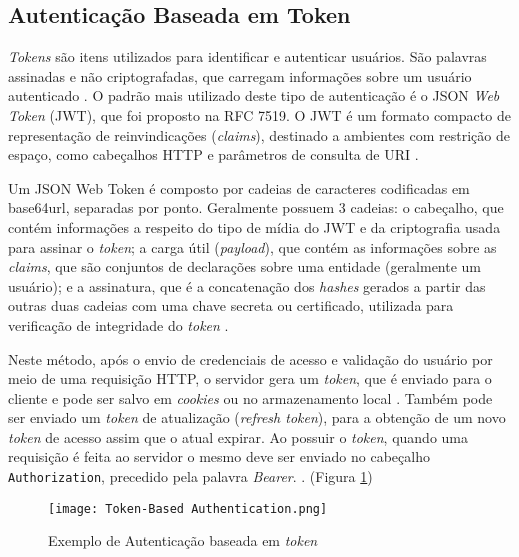 \subsection{Autenticação Baseada em Token}

\emph{Tokens} são itens utilizados para identificar e autenticar usuários. São palavras assinadas e 
não criptografadas, que carregam informações sobre um usuário autenticado \cite{BALAJ2017}. O 
padrão mais utilizado deste tipo de autenticação é o JSON \emph{Web Token} (JWT), que foi proposto
na RFC 7519. O JWT é um formato compacto de representação de reinvindicações (\emph{claims}), 
destinado a ambientes com restrição de espaço, como cabeçalhos HTTP e parâmetros de consulta de URI 
\cite{RFC7519}.

Um JSON Web Token é composto por cadeias de caracteres codificadas em base64url, separadas 
por ponto. Geralmente possuem 3 cadeias: o cabeçalho, que contém informações a respeito do tipo de mídia do 
JWT e da criptografia usada para assinar o \emph{token}; a carga útil (\emph{payload}), que contém 
as informações sobre as \emph{claims}, que são conjuntos de declarações sobre uma entidade 
(geralmente um usuário); e a assinatura, que é a concatenação dos \emph{hashes} gerados a partir das 
outras duas cadeias com uma chave secreta ou certificado, utilizada para verificação de integridade
do \emph{token} \cite{MONTANHEIRO2017}.

Neste método, após o envio de credenciais de acesso e validação do usuário por meio de uma 
requisição HTTP, o servidor gera um \emph{token}, que é enviado para o cliente e pode ser salvo
em \emph{cookies} ou no armazenamento local \cite{MONTANHEIRO2017}. Também pode ser enviado um 
\emph{token} de atualização (\emph{refresh token}), para a obtenção de um novo \emph{token} de acesso
assim que o atual expirar. Ao possuir o \emph{token}, quando uma requisição é feita ao servidor o 
mesmo deve ser enviado no cabeçalho \texttt{Authorization}, precedido pela palavra \emph{Bearer}. 
\cite{RFC6749}. (Figura \ref{fig:tokenAuth})

\begin{figure}[ht]
    \centering
    \texttt{[image: Token-Based Authentication.png]}
    \caption{Exemplo de Autenticação baseada em \emph{token}}
    \label{fig:tokenAuth}
  \end{figure}